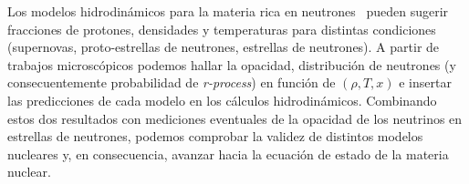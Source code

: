 Los modelos hidrodinámicos para la materia rica en neutrones~\cite{ruffert_coalescing_1995, mezzacappa_investigation_1998, geppert_temperature_2004, woosley_physics_2005, liebendorfer_supernova_2005} pueden sugerir fracciones de protones, densidades y temperaturas para distintas condiciones (supernovas, proto-estrellas de neutrones, estrellas de neutrones).
A partir de trabajos microscópicos podemos hallar la opacidad, distribución de neutrones (y consecuentemente probabilidad de \emph{r-process}) en función de $(\rho, T, x)$ e insertar las predicciones de cada modelo en los cálculos hidrodinámicos.
Combinando estos dos resultados con mediciones eventuales de la opacidad de los neutrinos en estrellas de neutrones, podemos comprobar la validez de distintos modelos nucleares y, en consecuencia, avanzar hacia la ecuación de estado de la materia nuclear.